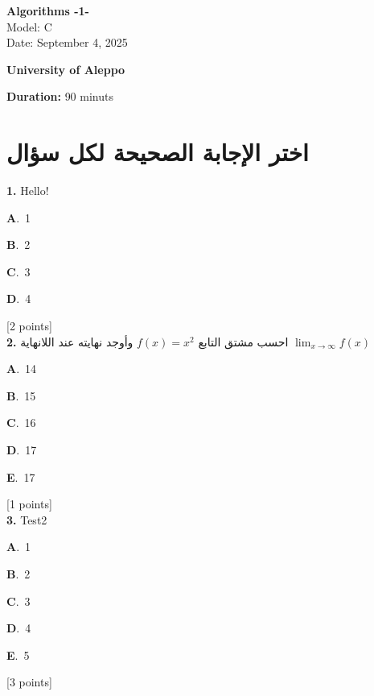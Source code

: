 \documentclass[12pt]{article}
\newcommand{\choice}[3]{%
  \noindent\textbf{#1}.~#2\hfill#3\par\vspace{0.25em}
}
\begin{document}
\begin{flushright}
{\Large \textbf{{\textenglish{Algorithms -1-}}}}\\[0.25em]
{\normalsize \textenglish{Model: }{\textenglish{C}}}\\[0.1em]
{\normalsize \textenglish{Date: }{\textenglish{September 4, 2025}}}
\end{flushright}

\vspace{0.6cm}

\noindent
\begin{minipage}[t]{0.65\textwidth}
  \raggedright
  \textbf{{\textenglish{University of Aleppo}}}\\[0.3em]
\end{minipage}\hfill
\begin{minipage}[t]{0.3\textwidth}
  \raggedleft
  \textenglish{\textbf{Duration: }}{\textenglish{90 minuts}}
\end{minipage}

\vspace{0.9cm}

\section*{اختر الإجابة الصحيحة لكل سؤال}

\noindent \textbf{\textenglish{1.}} {\textenglish{Hello!}}

\noindent\choice{A}{{\textenglish{1}}}{}
\noindent\choice{B}{{\textenglish{2}}}{}
\noindent\choice{C}{{\textenglish{3}}}{}
\noindent\choice{D}{{\textenglish{4}}}{}
\hfill {\textenglish{[2 points]}}\\[0.5em]

\noindent \textbf{\textenglish{2.}} {\textarabic{احسب مشتق التابع }}\( f(x) = x^2\){\textarabic{ وأوجد نهايته عند اللانهاية }}\(\lim_{x \to \infty}f(x)\)

\noindent\choice{A}{{\textenglish{14}}}{}
\noindent\choice{B}{{\textenglish{15}}}{}
\noindent\choice{C}{{\textenglish{16}}}{}
\noindent\choice{D}{{\textenglish{17}}}{}
\noindent\choice{E}{{\textenglish{17}}}{}
\hfill {\textenglish{[1 points]}}\\[0.5em]

\noindent \textbf{\textenglish{3.}} {\textenglish{Test2}}

\noindent\choice{A}{{\textenglish{1}}}{}
\noindent\choice{B}{{\textenglish{2}}}{}
\noindent\choice{C}{{\textenglish{3}}}{}
\noindent\choice{D}{{\textenglish{4}}}{}
\noindent\choice{E}{{\textenglish{5}}}{}
\hfill {\textenglish{[3 points]}}\\[0.5em]
\end{document}

